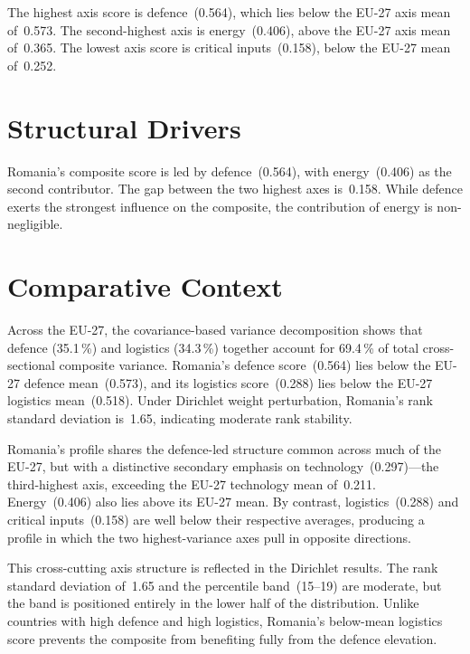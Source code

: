 \documentclass[12pt,a4paper]{article}
\begin{document}
The highest axis score is defence~(0.564), which lies below the EU-27 axis mean of~0.573.  The second-highest axis is energy~(0.406), above the EU-27 axis mean of~0.365.  The lowest axis score is critical inputs~(0.158), below the EU-27 mean of~0.252.


\section{Structural Drivers}
\label{sec:drivers}

\begin{sloppypar}
Romania's composite score is led by defence~(0.564), with energy~(0.406) as the second contributor.  The gap between the two highest axes is~0.158.  While defence exerts the strongest influence on the composite, the contribution of energy is non-negligible.
\end{sloppypar}


\section{Comparative Context}
\label{sec:comparative}

Across the EU-27, the covariance-based variance decomposition shows that defence (35.1\,\%) and logistics (34.3\,\%) together account for 69.4\,\% of total cross-sectional composite variance.  Romania's defence score~(0.564) lies below the EU-27 defence mean~(0.573), and its logistics score~(0.288) lies below the EU-27 logistics mean~(0.518).  Under Dirichlet weight perturbation, Romania's rank standard deviation is~1.65, indicating moderate rank stability.



Romania's profile shares the defence-led structure common across much of the EU-27, but with a distinctive secondary emphasis on technology~(0.297)---the third-highest axis, exceeding the EU-27 technology mean of~0.211.  Energy~(0.406) also lies above its EU-27 mean.  By contrast, logistics~(0.288) and critical inputs~(0.158) are well below their respective averages, producing a profile in which the two highest-variance axes pull in opposite directions.

This cross-cutting axis structure is reflected in the Dirichlet results.  The rank standard deviation of~1.65 and the percentile band~(15--19) are moderate, but the band is positioned entirely in the lower half of the distribution.  Unlike countries with high defence and high logistics, Romania's below-mean logistics score prevents the composite from benefiting fully from the defence elevation.
\end{document}

